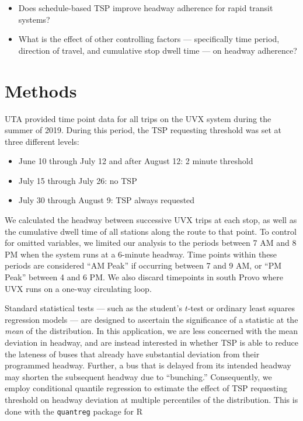 \documentclass[3p, authoryear, review]{elsarticle} %
\providecommand{\tightlist}{%
  \setlength{\itemsep}{0pt}\setlength{\parskip}{0pt}}
\begin{document}
\begin{itemize}
\tightlist
\item
  Does schedule-based TSP improve headway adherence for rapid transit systems?
\item
  What is the effect of other controlling factors --- specifically time period,
  direction of travel, and cumulative stop dwell time --- on headway adherence?
\end{itemize}

\hypertarget{methods}{%
\section{Methods}\label{methods}}

UTA provided time point data for all trips on the UVX system during the summer
of 2019. During this period, the TSP requesting threshold was set at three
different levels:

\begin{itemize}
\tightlist
\item
  June 10 through July 12 and after August 12: 2 minute threshold
\item
  July 15 through July 26: no TSP
\item
  July 30 through August 9: TSP always requested
\end{itemize}

We calculated the headway between successive UVX trips at each stop, as
well as the cumulative dwell time of all stations along the route to that point.
To control for omitted variables, we limited our analysis to the periods
between 7 AM and 8 PM when the system runs at a 6-minute headway. Time points
within these periods are considered ``AM Peak'' if occurring between 7 and 9 AM,
or ``PM Peak'' between 4 and 6 PM. We also discard timepoints in south Provo where
UVX runs on a one-way circulating loop.

Standard statistical tests --- such as the student's \(t\)-test or
ordinary least squares regression models --- are designed to ascertain the
significance of a statistic at the \emph{mean} of the distribution. In this
application, we are less concerned with the mean deviation in headway, and are
instead interested in whether TSP is able to reduce the lateness of buses that
already have substantial deviation from their programmed headway. Further, a bus
that is delayed from its intended headway may shorten the subsequent headway due
to ``bunching.'' Consequently, we employ conditional quantile regression
\citep{koenker2001quantile} to estimate the effect of TSP requesting threshold on
headway deviation at multiple percentiles of the distribution. This is
done with the \texttt{quantreg} package for R \citep{quantreg, R}
\end{document}
